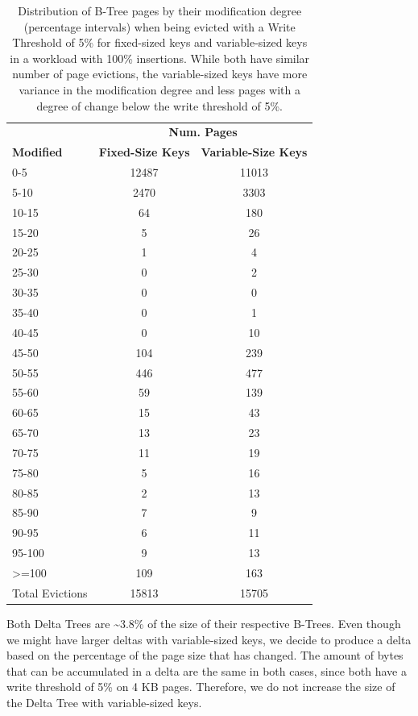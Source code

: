 \begin{table}[ht]
\centering
\begin{tabular}{l|cc}
   \toprule
    & \multicolumn{2}{c}{\textbf{Num. Pages}} \\
    \cmidrule(lr){2-3}
    \textbf{Modified} & \textbf{Fixed-Size Keys} & \textbf{Variable-Size Keys} \\
    \midrule
    0-5     & 12487 & 11013 \\
    5-10    & 2470  & 3303  \\
    10-15   & 64    & 180   \\
    15-20   & 5     & 26    \\
    20-25   & 1     & 4     \\
    25-30   & 0     & 2     \\
    30-35   & 0     & 0     \\
    35-40   & 0     & 1     \\
    40-45   & 0     & 10    \\
    45-50   & 104   & 239   \\
    50-55   & 446   & 477   \\
    55-60   & 59    & 139   \\
    60-65   & 15    & 43    \\
    65-70   & 13    & 23    \\
    70-75   & 11    & 19    \\
    75-80   & 5     & 16    \\
    80-85   & 2     & 13    \\
    85-90   & 7     & 9     \\
    90-95   & 6     & 11    \\
    95-100  & 9     & 13    \\
    >=100   & 109   & 163   \\
    \midrule
    Total Evictions & 15813 & 15705 \\
\bottomrule
\end{tabular}
\caption{Distribution of B-Tree pages by their modification degree (percentage intervals) when being evicted with a Write Threshold of 5\% for fixed-sized keys and variable-sized keys in a workload with 100\% insertions. While both have similar number of page evictions, the variable-sized keys have more variance in the modification degree and less pages with a degree of change below the write threshold of 5\%.}
\label{tab:modification-degree-variable-size}
\end{table}


Both Delta Trees are \textasciitilde3.8\% of the size of their respective B-Trees.
Even though we might have larger deltas with variable-sized keys, we decide to produce a delta based on the percentage of the page size that has changed.
The amount of bytes that can be accumulated in a delta are the same in both cases, since both have a write threshold of 5\% on 4 KB pages.
Therefore, we do not increase the size of the Delta Tree with variable-sized keys.


